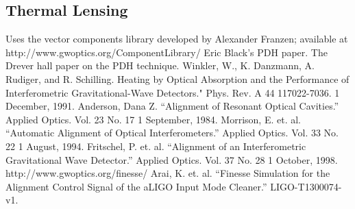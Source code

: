 \documentclass[10pt]{article}
\begin{document}
\subsection{Thermal Lensing}


\begin{thebibliography}{9}
		Uses the vector components library developed by Alexander Franzen; available at http://www.gwoptics.org/ComponentLibrary/
		Eric Black's PDH paper.
		The Drever hall paper on the PDH technique.		
		Winkler, W., K. Danzmann, A. Rudiger, and R. Schilling. Heating by Optical Absorption and 
		the Performance of Interferometric Gravitational-Wave Detectors." Phys. Rev. A 44 117022-7036. 1 December, 1991.
		Anderson, Dana Z.  ``Alignment of Resonant Optical Cavities.''  Applied Optics.  
		Vol. 23 No. 17 1 September, 1984.
		Morrison, E. et. al. ``Automatic Alignment of Optical Interferometers.''  Applied Optics.  
		Vol. 33 No. 22 1 August, 1994.
		Fritschel, P. et. al. ``Alignment of an Interferometric Gravitational Wave Detector.''  Applied Optics.  
		Vol. 37 No. 28 1 October, 1998.	
		http://www.gwoptics.org/finesse/
		Arai, K. et. al. ``Finesse Simulation for the Alignment Control Signal of the aLIGO Input Mode 
		Cleaner.'' LIGO-T1300074-v1.
\end{thebibliography}		
\end{document}
